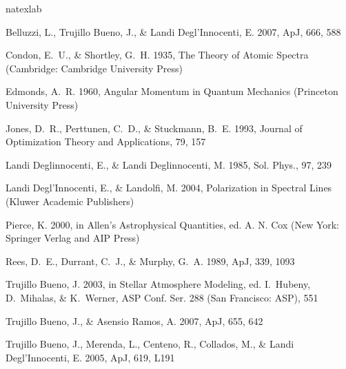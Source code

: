 \documentclass[12pt]{article}
\begin{document}
\begin{thebibliography}{11}
\expandafter\ifx\csname natexlab\endcsname\relax\def\natexlab#1{#1}\fi

{Belluzzi}, L., {Trujillo Bueno}, J., \& {Landi Degl'Innocenti}, E. 2007, ApJ,
  666, 588

{Condon}, E.~U., \& {Shortley}, G.~H. 1935, The Theory of Atomic Spectra
  (Cambridge: Cambridge University Press)

{Edmonds}, A.~R. 1960, Angular Momentum in Quantum Mechanics (Princeton
  University Press)

{Jones}, D.~R., {Perttunen}, C.~D., \& {Stuckmann}, B.~E. 1993, Journal of
  Optimization Theory and Applications, 79, 157

{Landi Deglinnocenti}, E., \& {Landi Deglinnocenti}, M. 1985, Sol. Phys., 97,
  239

{Landi Degl'Innocenti}, E., \& {Landolfi}, M. 2004, Polarization in Spectral
  Lines (Kluwer Academic Publishers)

{Pierce}, K. 2000, in Allen's Astrophysical Quantities, ed. A. N. Cox (New
  York: Springer Verlag and AIP Press)

{Rees}, D.~E., {Durrant}, C.~J., \& {Murphy}, G.~A. 1989, ApJ, 339, 1093

{Trujillo Bueno}, J. 2003, in Stellar Atmosphere Modeling, ed. I.~{Hubeny},
  D.~{Mihalas}, \& K.~{Werner}, ASP Conf. Ser. 288 (San Francisco: ASP), 551

{Trujillo Bueno}, J., \& {Asensio Ramos}, A. 2007, ApJ, 655, 642

{Trujillo Bueno}, J., {Merenda}, L., {Centeno}, R., {Collados}, M., \& {Landi
  Degl'Innocenti}, E. 2005, ApJ, 619, L191

\end{thebibliography}
\end{document}
